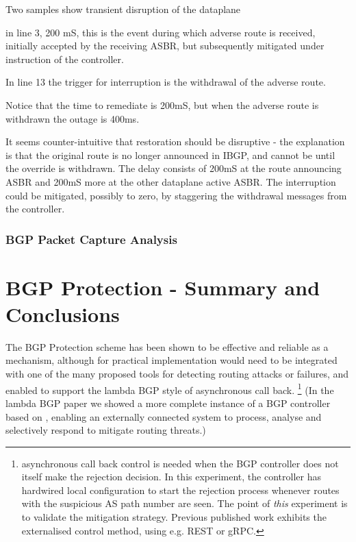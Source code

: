 Two samples show transient disruption of the dataplane

in line 3, 200 mS, this is the event during which adverse route is received, initially accepted by the receiving ASBR, but subsequently mitigated under instruction of the controller.

In line 13 the trigger for interruption is the withdrawal of the adverse route.

Notice that the time to remediate is 200mS, but when the adverse route is withdrawn the outage is 400ms.

It seems counter-intuitive that restoration should be disruptive - the explanation is that the original route is no longer announced in IBGP, and cannot be until the override is withdrawn.
The delay consists of 200mS at the route announcing ASBR and 200mS more at the other dataplane active ASBR.
The interruption could be mitigated, possibly to zero, by staggering the withdrawal messages from the controller.


\subsubsection{BGP Packet Capture Analysis}


\section{BGP Protection - Summary and Conclusions}

The BGP Protection scheme has been shown to be effective and reliable as a mechanism, although for practical implementation would need to be integrated with one of the many proposed tools for detecting routing attacks or failures, and enabled to support the lambda BGP style of asynchronous call back. \footnote{asynchronous call back control is needed when the BGP controller does not itself make the rejection decision.  In this experiment, the \hbgp controller has hardwired local configuration to start the rejection process whenever routes with the suspicious AS path number are seen.  The point of \textit{this} experiment is to validate the mitigation strategy.  Previous published work exhibits the externalised control method, using e.g. REST or gRPC.} (In the lambda BGP paper\cite{lambdabgp} we showed a more complete instance of a BGP controller based on \hbgp, enabling an externally connected system to process, analyse and selectively respond to mitigate routing threats.)

